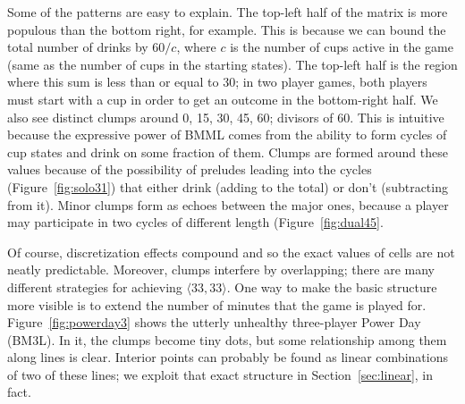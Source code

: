 \documentclass[twocolumn]{article}
\begin{document}
Some of the patterns are easy to explain. The top-left half of the
matrix is more populous than the bottom right, for example. This is
because we can bound the total number of drinks by $60 / c$, where $c$
is the number of cups active in the game (same as the number of cups
in the starting states). The top-left half is the region where this
sum is less than or equal to 30; in two player games, both players
must start with a cup in order to get an outcome in the bottom-right
half. We also see distinct clumps around 0, 15, 30, 45, 60; divisors
of 60. This is intuitive because the expressive power of BMML comes
from the ability to form cycles of cup states and drink on some
fraction of them. Clumps are formed around these values because of the
possibility of preludes leading into the cycles
(Figure~\ref{fig:solo31}) that either drink (adding to the total) or
don't (subtracting from it). Minor clumps form as echoes between the
major ones, because a player may participate in two cycles of
different length (Figure~\ref{fig:dual45}.

Of course, discretization effects compound and so the exact values of
cells are not neatly predictable. Moreover, clumps interfere by
overlapping; there are many different strategies for achieving
$\langle 33, 33 \rangle$. One way to make the basic structure more
visible is to extend the number of minutes that the game is played
for. Figure~\ref{fig:powerday3} shows the utterly unhealthy
three-player Power Day (BM3L). In it, the clumps become tiny dots,
but some relationship among them along lines is clear. Interior points
can probably be found as linear combinations of two of these lines;
we exploit that exact structure in Section~\ref{sec:linear}, in fact.
\end{document}
